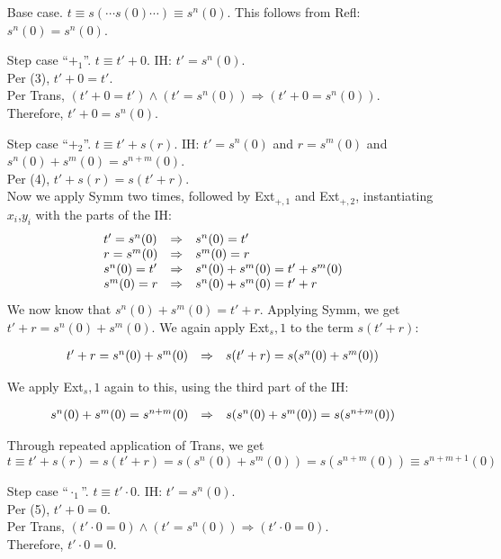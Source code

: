 \begin{itemize}
	\item[Base case.] $t \equiv s(\cdots s(0)\cdots) \equiv s^n(0)$. This follows from Refl: $s^n(0) = s^n(0)$.
	
	\item[Step case ``$+_1$''.] $t \equiv t' + 0$. IH: $t' = s^n(0)$.\\
	Per (3), $t' + 0 = t'$.\\
	Per Trans, $(t' + 0 = t') \wedge (t' = s^n(0)) \Rightarrow (t' + 0 = s^n(0))$.\\
	Therefore, $t' + 0 = s^n(0)$.
	
	\item[Step case ``$+_2$''.] $t \equiv t' + s(r)$. IH: $t' = s^n(0)$ and $r = s^m(0)$ and $s^n(0) + s^m(0) = s^{n+m}(0)$.\\
	Per (4), $t' + s(r) = s(t' + r)$.\\
	Now we apply Symm two times, followed by Ext$_{+,1}$ and Ext$_{+,2}$, instantiating $x_i$,$y_i$ with the parts of the IH:
	$$
		\begin{array}{l l l}
			t' = s^n(0) & \Rightarrow & s^n(0) = t'\\
			r = s^m(0) & \Rightarrow & s^m(0) = r\\
			s^n(0) = t' & \Rightarrow & s^n(0) + s^m(0) = t' + s^m(0)\\
			s^m(0) = r & \Rightarrow & s^n(0) + s^m(0) = t' + r
		\end{array}
	$$
	We now know that $s^n(0) + s^m(0) = t' + r$. Applying Symm, we get $t' + r = s^n(0) + s^m(0)$. We again apply Ext$_s,1$ to the term $s(t' + r)$:
	
	$$
		\begin{array}{l l l}
			t' + r = s^n(0) + s^m(0) & \Rightarrow & s(t' + r) = s(s^n(0) + s^m(0))
		\end{array}
	$$
	
	We apply Ext$_s,1$ again to this, using the third part of the IH:
	
	$$
		\begin{array}{l l l}
			s^n(0) + s^m(0) = s^{n+m}(0) & \Rightarrow & s(s^n(0) + s^m(0)) = s(s^{n+m}(0))
		\end{array}
	$$
	
	Through repeated application of Trans, we get
	$$
		t \equiv t' + s(r) = s(t' + r) = s(s^n(0) + s^m(0)) = s(s^{n+m}(0)) \equiv s^{n+m+1}(0)
	$$
	
	\item[Step case ``$\cdot_1$''.] $t \equiv t' \cdot 0$. IH: $t' = s^n(0)$.\\
	Per (5), $t' + 0 = 0$.\\
	Per Trans, $(t' \cdot 0 = 0) \wedge (t' = s^n(0)) \Rightarrow (t' \cdot 0 = 0)$.\\
	Therefore, $t' \cdot 0 = 0$.
	

\end{itemize}
